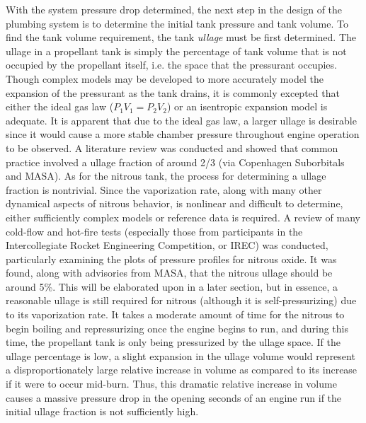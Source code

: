 \documentclass[9pt]{article} %
\numberwithin{equation}{section} %
\begin{document}
\hspace{\parindent} With the system pressure drop determined, the next step in the design of the plumbing system is to determine the initial tank pressure and tank volume. To find the tank volume requirement, the tank \textit{ullage} must be first determined. The ullage in a propellant tank is simply the percentage of tank volume that is not occupied by the propellant itself, i.e. the space that the pressurant occupies. Though complex models may be developed to more accurately model the expansion of the pressurant as the tank drains, it is commonly excepted that either the ideal gas law ($P_{1}V_{1} = P_{2}V_{2}$) or an isentropic expansion model is adequate. It is apparent that due to the ideal gas law, a larger ullage is desirable since it would cause a more stable chamber pressure throughout engine operation to be observed. A literature review was conducted and showed that common practice involved a ullage fraction of around 2/3 (via Copenhagen Suborbitals and MASA). As for the nitrous tank, the process for determining a ullage fraction is nontrivial. Since the vaporization rate, along with many other dynamical aspects of nitrous behavior, is nonlinear and difficult to determine, either sufficiently complex models or reference data is required. A review of many cold-flow and hot-fire tests (especially those from participants in the Intercollegiate Rocket Engineering Competition, or IREC) was conducted, particularly examining the plots of pressure profiles for nitrous oxide. It was found, along with advisories from MASA, that the nitrous ullage should be around 5\%. This will be elaborated upon in a later section, but in essence, a reasonable ullage is still required for nitrous (although it is self-pressurizing) due to its vaporization rate. It takes a moderate amount of time for the nitrous to begin boiling and repressurizing once the engine begins to run, and during this time, the propellant tank is only being pressurized by the ullage space. If the ullage percentage is low, a slight expansion in the ullage volume would represent a disproportionately large relative increase in volume as compared to its increase if it were to occur mid-burn. Thus, this dramatic relative increase in volume causes a massive pressure drop in the opening seconds of an engine run if the initial ullage fraction is not sufficiently high.
\end{document}
